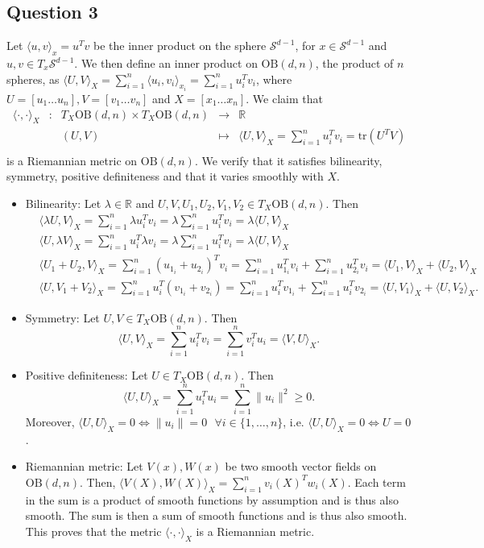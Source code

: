 \documentclass{article}
\begin{document}
\subsection*{Question 3}
Let $\langle u, v \rangle_x = u^Tv$ be the inner product on the sphere $\mathcal{S}^{d-1}$, for $x\in\mathcal{S}^{d-1}$ and $u, v\in T_x\mathcal{S}^{d-1}$. We then define an inner product on $\text{OB}(d, n)$, the product of $n$ spheres, as $\langle U, V\rangle_X = \sum_{i=1}^n\langle u_i, v_i\rangle_{x_i} = \sum_{i=1}^n u_i^Tv_i$, where $U=[u_1\ldots u_n], V=[v_1\ldots v_n]$ and $X=[x_1\ldots x_n]$. We claim that
$$
\begin{array}{ccccc}
\langle\cdot, \cdot\rangle_X & : & T_X\text{OB}(d, n) \times T_X\text{OB}(d, n) & \to & \mathbb{R} \\
 & & (U, V) & \mapsto & \langle U, V\rangle_X = \sum_{i=1}^n u_i^Tv_i = \text{tr}(U^TV)\\
\end{array}
$$
is a Riemannian metric on $\text{OB}(d, n)$. We verify that it satisfies bilinearity, symmetry, positive definiteness and that it varies smoothly with $X$.
\begin{itemize}
    \item Bilinearity: Let $\lambda \in \mathbb{R}$ and $U, V, U_1, U_2, V_1, V_2\in T_X\text{OB}(d, n)$. Then
    \begin{align*}
        & \langle \lambda U, V\rangle_X = \sum_{i=1}^n\lambda u_i^Tv_i = \lambda\sum_{i=1}^nu_i^Tv_i = \lambda\langle U, V\rangle_X\\
        & \langle U, \lambda V\rangle_X = \sum_{i=1}^n u_i^T\lambda v_i = \lambda\sum_{i=1}^nu_i^Tv_i = \lambda\langle U, V\rangle_X\\
        & \langle U_1 + U_2, V\rangle_X = \sum_{i=1}^n(u_{1_i}+u_{2_i})^Tv_i = \sum_{i=1}^nu_{1_i}^Tv_i + \sum_{i=1}^nu_{2_i}^Tv_i = \langle U_1, V\rangle_X + \langle U_2, V\rangle_X\\
        & \langle U, V_1 + V_2\rangle_X = \sum_{i=1}^nu_i^T(v_{1_i}+v_{2_i}) = \sum_{i=1}^nu_i^Tv_{1_i} + \sum_{i=1}^nu_i^Tv_{2_i} = \langle U, V_1\rangle_X + \langle U, V_2\rangle_X.
    \end{align*}
    \item Symmetry: Let $U, V\in T_X\text{OB}(d, n)$. Then
    $$
    \langle U, V\rangle_X = \sum_{i=1}^n u_i^Tv_i = \sum_{i=1}^nv_i^Tu_i = \langle V, U\rangle_X.
    $$
    \item Positive definiteness: Let $U\in T_X\text{OB}(d, n)$. Then
    $$
    \langle U, U\rangle_X = \sum_{i=1}^nu_i^Tu_i = \sum_{i=1}^n\|u_i\|^2 \geq 0.
    $$
    Moreover, $\langle U, U\rangle_X = 0 \iff \|u_i\|=0\text{ }\forall i\in\{1, \ldots, n\}$, i.e. $\langle U, U\rangle_X = 0 \iff U=0$.
    \item Riemannian metric: Let $V(x), W(x)$ be two smooth vector fields on $\text{OB}(d, n)$. Then, $\langle V(X), W(X)\rangle_X = \sum_{i=1}^nv_i(X)^Tw_i(X)$. Each term in the sum is a product of smooth functions by assumption and is thus also smooth. The sum is then a sum of smooth functions and is thus also smooth. This proves that the metric $\langle\cdot, \cdot\rangle_X$ is a Riemannian metric.
\end{itemize}
\end{document}
